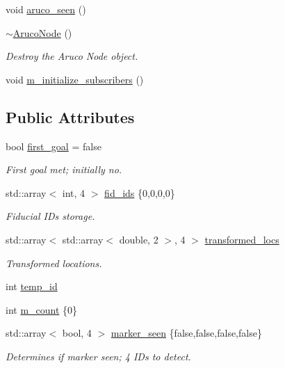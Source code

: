 \begin{DoxyCompactItemize}
void \hyperlink{class_aruco_node_a21fe5af1a16e884424a4065ca6dd608f}{aruco\+\_\+seen} ()
\item 
\hyperlink{class_aruco_node_a134694163a28530a800198e2c039eb25}{$\sim$\+Aruco\+Node} ()
\begin{DoxyCompactList}\small\item\em Destroy the Aruco Node object. \end{DoxyCompactList}\item 
void \hyperlink{class_aruco_node_a3aa9013d9f53f08c7de83be3359f7503}{m\+\_\+initialize\+\_\+subscribers} ()
\end{DoxyCompactItemize}
\subsection*{Public Attributes}
\begin{DoxyCompactItemize}
\item 
bool \hyperlink{class_aruco_node_a323a2a97fc30a4e6daf59d9577485569}{first\+\_\+goal} = false
\begin{DoxyCompactList}\small\item\em First goal met; initially no. \end{DoxyCompactList}\item 
std\+::array$<$ int, 4 $>$ \hyperlink{class_aruco_node_aa64bc8aad47d7569e315f5045ecaa7ac}{fid\+\_\+ids} \{0,0,0,0\}
\begin{DoxyCompactList}\small\item\em Fiducial I\+Ds storage. \end{DoxyCompactList}\item 
std\+::array$<$ std\+::array$<$ double, 2 $>$, 4 $>$ \hyperlink{class_aruco_node_ab410bc0b655071ee67e7ba63b4edf256}{transformed\+\_\+locs}
\begin{DoxyCompactList}\small\item\em Transformed locations. \end{DoxyCompactList}\item 
int \hyperlink{class_aruco_node_ac9561321e855855ccc8f643cc139a638}{temp\+\_\+id}
\item 
int \hyperlink{class_aruco_node_a454cdb8d15fa07e7913887a1b2029600}{m\+\_\+count} \{0\}
\item 
std\+::array$<$ bool, 4 $>$ \hyperlink{class_aruco_node_a2e41167c119527f9fbeb937838fc8909}{marker\+\_\+seen} \{false,false,false,false\}
\begin{DoxyCompactList}\small\item\em Determines if marker seen; 4 I\+Ds to detect. \end{DoxyCompactList}\end{DoxyCompactItemize}


